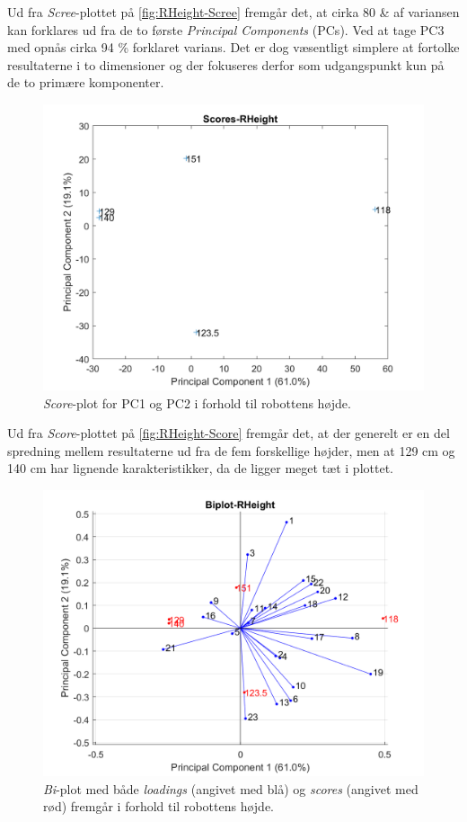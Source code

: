 \noindent
%
Ud fra \textit{Scree}-plottet på \autoref{fig:RHeight-Scree} fremgår det, at cirka 80 \& af variansen kan forklares ud fra de to første \textit{Principal Components} (PCs). Ved at tage PC3 med opnås cirka 94 \% forklaret varians. Det er dog væsentligt simplere at fortolke resultaterne i to dimensioner og der fokuseres derfor som udgangspunkt kun på de to primære komponenter.
%
\begin{figure}[H]
\centering
\includegraphics[width=\textwidth]{Figure/DatabehandlingSkalaer/PCAfigures/RHeight-Scores}
\caption{\textit{Score}-plot for PC1 og PC2 i forhold til robottens højde.}
\label{fig:RHeight-Score}
\end{figure}
\noindent
%
Ud fra \textit{Score}-plottet på \autoref{fig:RHeight-Score} fremgår det, at der generelt er en del spredning mellem resultaterne ud fra de fem forskellige højder, men at 129 cm og 140 cm har lignende karakteristikker, da de ligger meget tæt i plottet.
%
\begin{figure}[H]
\centering
\includegraphics[width=\textwidth]{Figure/DatabehandlingSkalaer/PCAfigures/RHeight-Biplot.png}
\caption{\textit{Bi}-plot med både \textit{loadings} (angivet med blå) og \textit{scores} (angivet med rød) fremgår i forhold til robottens højde.}
\label{fig:RHeight-Biplot}
\end{figure}
